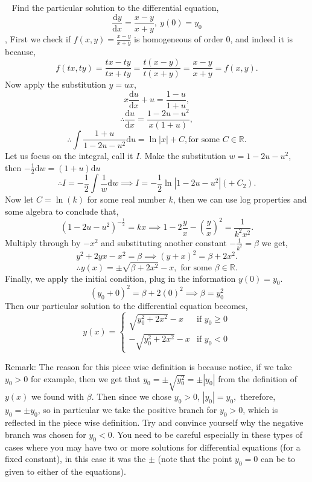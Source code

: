 \documentclass[../../main.tex]{subfiles}
\begin{document}
\begin{example}{~}
Find the particular solution to the differential equation,
$$\frac{\mathrm{d}y}{\mathrm{d}x}=\frac{x-y}{x+y}, \ y(0)=y_0$$
\sep
First we check if $f(x,y)=\frac{x-y}{x+y}$ is homogeneous of order $0$, and indeed it is because,
$$f(tx,ty)=\frac{tx-ty}{tx+ty}=\frac{t(x-y)}{t(x+y)}=\frac{x-y}{x+y}=f(x,y).$$
Now apply the substitution $y=ux$,
$$x\frac{\mathrm{d}u}{\mathrm{d}x}+u=\frac{1-u}{1+u},$$
$$\therefore \frac{\mathrm{d}u}{\mathrm{d}x}=\frac{1-2u-u^2}{x(1+u)},$$
$$\therefore \int\frac{1+u}{1-2u-u^2}\mathrm{d}u=\ln|x|+C, \text{for some $C \in \mathbb{R}$}.$$
Let us focus on the integral, call it $I$. Make the substitution $w=1-2u-u^2$, then $-\frac{1}{2}\mathrm{d}w=(1+u)\mathrm{d}u$
$$\therefore I=-\frac{1}{2}\int \frac{1}{w}\mathrm{d}w \implies I=-\frac{1}{2}\ln|1-2u-u^2|(+ \ C_{2}).$$
Now let $C=\ln(k)$ for some real number $k$, then we can use log properties and some algebra to conclude that,
$$(1-2u-u^2)^{-\frac{1}{2}}=kx \implies 1-2\frac{y}{x}-\left(\frac{y}{x}\right)^2=\frac{1}{k^2x^2}.$$
Multiply through by $-x^2$ and substituting another constant $-\frac{1}{k^2}=\beta$ we get,
$$y^2+2yx-x^2=\beta \implies (y+x)^2=\beta+2x^2.$$
$$\therefore y(x)= \pm\sqrt{\beta+2x^2}-x, \text{ for some } \beta \in \mathbb{R}.$$
Finally, we apply the initial condition, plug in the information $y(0)=y_0$.
$$(y_0+0)^2=\beta+2(0)^2 \implies \beta = y_0^2$$
Then our particular solution to the differential equation becomes,
\[
y(x)=
\begin{cases}
\sqrt{y_0^2+2x^2}-x & \text{if $y_0 \geq 0$} \\
-\sqrt{y_0^2+2x^2}-x & \text{if $y_0<0$}
\end{cases}
\]
\end{example}

\newpage

Remark: The reason for this piece wise definition is because notice, if we take $y_0>0$ for example, then we get that $y_0=\pm\sqrt{y_0^2}=\pm|y_0|$ from the definition of $y(x)$ we found with $\beta$. Then since we chose $y_0>0$, $|y_0|=y_0,$ therefore, $y_0=\pm y_0$, so in particular we take the positive branch for $y_0>0$, which is reflected in the piece wise definition. Try and convince yourself why the negative branch was chosen for $y_0<0$.
You need to be careful especially in these types of cases where you may have two or more solutions for differential equations (for a fixed constant), in this case it was the $\pm$ (note that the point $y_0=0$ can be to given to either of the equations).
\end{document}
